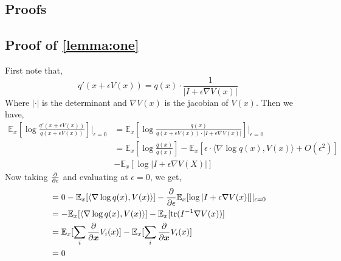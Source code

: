 \newpage
\begin{appendices}


\section{Proofs}

\subsection{Proof of \ref{lemma:one}}\label{Proofs:one}
First note that,
\begin{equation}
    q'(x+ \epsilon V(x)) = q(x) \cdot \frac{1}{|I + \epsilon \nabla V(x)|}
\end{equation}
Where $|\cdot|$ is the determinant and $\nabla V(x)$ is the jacobian of $V(x)$. Then we have, 
\begin{align}
    \mathbb{E}_{x} \left[\log \frac{q'(x + \epsilon V(x))}{q(x+ \epsilon V(x))} \right]|_{\epsilon=0}
    &{}=\mathbb{E}_{x} \left[\log \frac{q(x)}{q(x+ \epsilon V(x)) \cdot | I + \epsilon \nabla V(x) |} \right]|_{\epsilon=0} \\ 
    &= \mathbb{E}_{x} \left[\log \frac{q(x)}{q(x)} \right] - \mathbb{E}_{x} \left[\epsilon \cdot \langle \nabla \log q(x) , V(x) \rangle + O(\epsilon^{2}) \right] \\  &- \mathbb{E}_{x} \left[\log |I + \epsilon \nabla V(X)| \right]
\end{align}
Now taking $\frac{\partial}{\partial \epsilon}$ and evaluating at $\epsilon=0$, we get,
\begin{align}
    &{} = 0 - \mathbb{E}_{x}[\langle \nabla \log q(x), V(x) \rangle ] - \frac{\partial}{\partial \epsilon} \mathbb{E}_{x}[\log | I + \epsilon \nabla V(x) |]|_{\epsilon=0} \\
    &= - \mathbb{E}_{x}[\langle \nabla \log q(x) , V(x) \rangle ] - \mathbb{E}_{x}[\text{tr}(I^{-1} \nabla V(x)) ] \\
    &= \mathbb{E}_{x}[\sum_{i} \frac{\partial}{\partial \bm{x}} V_{i}(x)] - \mathbb{E}_{x}[\sum_{i} \frac{\partial}{\partial \bm{x}} V_{i}(x)] \\ 
    &= 0
\end{align}




\end{appendices}